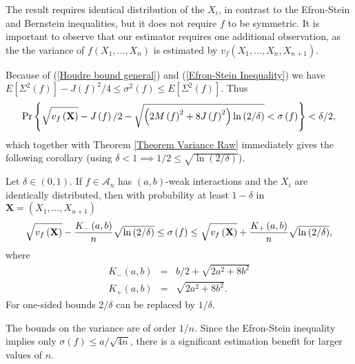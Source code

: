 \documentclass[final,12pt]{colt2018} %
\begin{document}
		The result requires identical distribution of the $X_{i}$, in contrast to
		the Efron-Stein and Bernstein inequalities, but it does not require $f$ to
		be symmetric.  It is important to observe that our estimator requires one additional
		observation, as the the variance of $f\left( X_{1},...,X_{n}\right) $ is estimated by $v_{f}\left( X_{1},...,X_{n},X_{n+1}\right)$.
		
		Because of (\ref{Houdre bound general}) and (\ref{Efron-Stein Inequality})
		we have $E\left[ \Sigma ^{2}\left( f\right) \right] -J\left( f\right)
		^{2}/4\leq \sigma ^{2}\left( f\right) \leq E\left[ \Sigma ^{2}\left(
		f\right) \right] $. Thus%
		\begin{equation*}
		\Pr \left\{ \sqrt{v_{f}\left( \mathbf{X}\right) }-J\left( f\right) /2-\sqrt{%
			\left( 2M\left( f\right) ^{2}+8J\left( f\right) ^{2}\right) \ln \left(
			2/\delta \right) }<\sigma \left( f\right) \right\} <\delta /2, 
		\end{equation*}%
		which together with Theorem \ref{Theorem Variance Raw} immediately gives the
		following corollary (using $\delta <1\implies 1/2\leq \sqrt{\ln \left(
			2/\delta \right) }$).
		
		\begin{corollary}
			\label{Corollary weak interaction variance}Let $\delta \in (0,1)$. If $f\in \mathcal{A}_{n}$ has $%
			\left( a,b\right) $-weak interactions and the $X_{i}$ are identically
			distributed, then with probability at least $1-\delta $ in $%
			\mathbf{X}=\left( X_{1},...,X_{n+1}\right) $%
			\begin{equation*}
			\sqrt{v_{f}\left( \mathbf{X}\right) }-\frac{K_{-}\left( a,b\right) }{n}\sqrt{%
				\ln \left( 2/\delta \right) }\leq \sigma \left( f\right) \leq \sqrt{%
				v_{f}\left( \mathbf{X}\right) }+\frac{K_{+}\left( a,b\right) }{n}\sqrt{\ln
				\left( 2/\delta \right) }, 
			\end{equation*}%
			where%
			\begin{eqnarray*}
				K_{-}\left( a,b\right) & = & b/2+\sqrt{2a^{2}+8b^{2}}\\
				K_{+}\left(a,b\right) & = & \sqrt{2a^{2}+8b^{2}}. 
			\end{eqnarray*}
			For one-sided bounds $2/\delta $ can be replaced by $1/\delta $.
		\end{corollary}
		The bounds on the variance are of order $1/n$. Since the Efron-Stein
		inequality implies only $\sigma \left( f\right) \leq a/\sqrt{4n}$, there is
		a significant estimation benefit for larger values of $n$.
		
\end{document}
